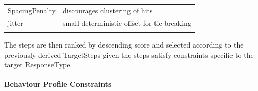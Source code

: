 \begin{longtable}[]{@{}
  >{\raggedright\arraybackslash}p{}
  >{\raggedright\arraybackslash}p{}@{}}
\begin{minipage}[b]{\linewidth}\raggedright
SpacingPenalty
\end{minipage} & \begin{minipage}[b]{\linewidth}\raggedright
discourages clustering of hits
\end{minipage} \\
\begin{minipage}[b]{\linewidth}\raggedright
jitter
\end{minipage} & \begin{minipage}[b]{\linewidth}\raggedright
small deterministic offset for tie-breaking
\end{minipage} \\
\midrule\noalign{}
\endhead
\bottomrule\noalign{}
\endlastfoot
\end{longtable}


The steps are then ranked by descending score and selected according to
the previously derived TargetSteps given the steps satisfy constraints
specific to the target ResponseType.

\paragraph{Behaviour Profile Constraints}\label{behaviour-profile-constraints}


